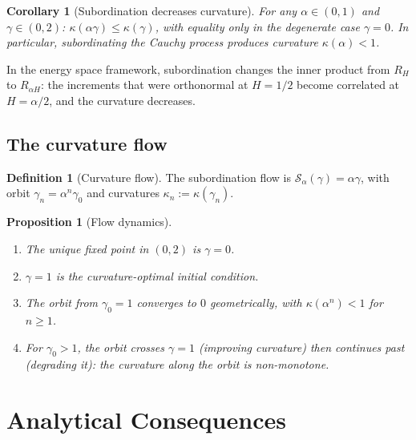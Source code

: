 \documentclass[11pt,a4paper]{article}
\theoremstyle{plain}
\newtheorem{proposition}[theorem]{Proposition}
\newtheorem{corollary}[theorem]{Corollary}
\theoremstyle{definition}
\newtheorem{definition}[theorem]{Definition}
\theoremstyle{remark}
\begin{document}
\begin{corollary}[Subordination decreases curvature]
\label{cor:sub}
For any $\alpha \in (0,1)$ and $\gamma \in (0,2)$:
$\kappa(\alpha\gamma) \leq \kappa(\gamma)$,
with equality only in the degenerate case $\gamma = 0$.
In particular, subordinating the Cauchy process
produces curvature $\kappa(\alpha) < 1$.
\end{corollary}

In the energy space framework, subordination changes
the inner product from $R_H$ to $R_{\alpha H}$:
the increments that were orthonormal at $H = 1/2$
become correlated at $H = \alpha/2$, and the curvature
decreases.


\subsection{The curvature flow}

\begin{definition}[Curvature flow]\label{def:flow}
The subordination flow is
$\mathcal{S}_\alpha(\gamma) = \alpha\gamma$,
with orbit $\gamma_n = \alpha^n\gamma_0$ and
curvatures $\kappa_n := \kappa(\gamma_n)$.
\end{definition}

\begin{proposition}[Flow dynamics]\label{prop:flow}
\begin{enumerate}[label=\textup{(\roman*)}]
\item The unique fixed point in $(0,2)$ is $\gamma = 0$.
\item $\gamma = 1$ is the curvature-optimal initial condition.
\item The orbit from $\gamma_0 = 1$ converges to $0$
  geometrically, with $\kappa(\alpha^n) < 1$ for $n \geq 1$.
\item For $\gamma_0 > 1$, the orbit crosses $\gamma = 1$
  (improving curvature) then continues past
  (degrading it): the curvature along the orbit is
  non-monotone.
\end{enumerate}
\end{proposition}



\section{Analytical Consequences}\label{sec:consequences}
\end{document}
